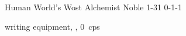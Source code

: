 \begin{filledCS}%
  {\composeHumanName}%
  {Human}%
  {World's Wost Alchemist}%
  {Noble}%
  {{1}{-3}{1}}%
  {{0}{-1}{-1}}%
  {%
    \setcounter{Academics}{2}
    \setcounter{Cultivation}{1}
    \setcounter{Empathy}{1}
    \setcounter{Vigilance}{1}
    \setcounter{Deceit}{1}

    \setcounter{Air}{1}
    \Dagger
  }%
  {\ritualcaster}%
  {writing equipment, \rations, 0~\glspl{cp}}%
  \renewcommand\rank{Fodder}
  \renewcommand\characterDebt{100 \glspl{sp}}

  \renewcommand\charSpells{
    \showSpells{Air1}
    \showSpells{Air1}

    \bigLine

    These higher level spells may only be cast by using an Air \gls{boon} to raise the Air \gls{sphere} by 1~level.

    \bigLine

    \showSpells{Air2}
    \showSpells{Air3}
  }
\end{filledCS}

